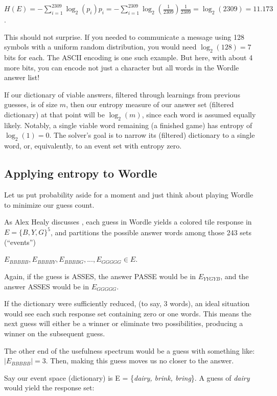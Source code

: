 \documentclass[11pt, oneside]{article} 	%
\begin{document}
$H(E) = -\sum_{i=1}^{2309} \log_2(p_i)p_i = -\sum_{i=1}^{2309} \log_2(\frac{1}{2309}) \frac{1}{2309} = \log_2(2309) = 11.173$. 

This should not surprise. If you needed to communicate a message using 128 symbols with a uniform random distribution, you would need $\log_2(128) = 7$ bits for each. The ASCII encoding is one such example. But here, with about 4 more bits, you can encode not just a character but all words in the Wordle answer list!

If our dictionary of viable answers, filtered through learnings from previous guesses, is of size $m$, then our entropy measure of our answer set (filtered dictionary) at that point will be $\log_2(m)$, since each word is assumed equally likely. Notably, a single viable word remaining (a finished game) has entropy of $\log_2(1) = 0$. The solver's goal is to narrow its (filtered) dictionary to a single word, or, equivalently, to an event set with entropy zero.
 
\subsection{Applying entropy to Wordle}

Let us put probability aside for a moment and just think about playing Wordle to minimize our guess count.

As Alex Healy discusses \cite{1}, each guess in Wordle yields a colored tile response in $E = \{B, Y, G\}^5$, and partitions the possible answer words among those 243 sets (``events'')

\begin{center}
$E_{BBBBB}, E_{BBBBY}, E_{BBBBG}, ... , E_{GGGGG} \in E$. 
\end{center}

Again, if the guess is ASSES, the answer PASSE would be in $E_{YYGYB}$, and the answer ASSES would be in $E_{GGGGG}$.

If the dictionary were sufficiently reduced, (to say, 3 words), an ideal situation would see each such response set containing zero or one words. This means the next guess will either be a winner or eliminate two possibilities, producing a winner on the subsequent guess. 

The other end of the usefulness spectrum would be a guess with something like:
$|E_{BBBBB}| = 3$. Then, making this guess moves us no closer to the answer. 

Say our event space (dictionary) is E = \{\emph{dairy, brink, bring}\}. A guess of \emph{dairy} would yield the response set:
\end{document}
